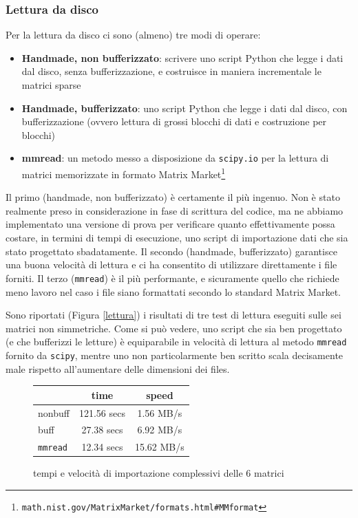 \documentclass[11pt,a4paper]{scrartcl}
\begin{document}
\subsubsection*{Lettura da disco}

Per la lettura da disco ci sono (almeno) tre modi di operare:
\begin{itemize}
\item \textbf{Handmade, non bufferizzato}: scrivere uno script Python che legge i dati dal disco, senza bufferizzazione, e costruisce in maniera incrementale le matrici sparse
\item \textbf{Handmade, bufferizzato}: uno script Python che legge i dati dal disco, con bufferizzazione (ovvero lettura di grossi blocchi di dati e costruzione per blocchi)
\item \textbf{mmread}: un metodo messo a disposizione da \texttt{scipy.io} per la lettura di matrici memorizzate in formato Matrix Market\footnote{\texttt{math.nist.gov/MatrixMarket/formats.html\#MMformat}}
\end{itemize}

Il primo (handmade, non bufferizzato) è certamente il più ingenuo. Non è stato realmente preso in considerazione in fase di scrittura del codice, ma ne abbiamo implementato una versione di prova per verificare quanto effettivamente possa costare, in termini di tempi di esecuzione, uno script di importazione dati che sia stato progettato sbadatamente. Il secondo (handmade, bufferizzato) garantisce una buona velocità di lettura e ci ha consentito di utilizzare direttamente i file forniti. Il terzo (\texttt{mmread}) è il più performante, e sicuramente quello che richiede meno lavoro nel caso i file siano formattati secondo lo standard Matrix Market.

Sono riportati (Figura \ref{lettura}) i risultati di tre test di lettura eseguiti sulle sei matrici non simmetriche. Come si può vedere, uno script che sia ben progettato (e che bufferizzi le letture) è equiparabile in velocità di lettura al metodo \texttt{mmread} fornito da \texttt{scipy}, mentre uno non particolarmente ben scritto scala decisamente male rispetto all'aumentare delle dimensioni dei files.

\begin{figure}[!ht]
\centering
\begin{tabular}{l|cc}
\toprule
& time & speed \\
\midrule
nonbuff & 121.56 secs & 1.56 MB/s \\
buff & 27.38 secs & 6.92 MB/s \\
\texttt{mmread} & 12.34 secs & 15.62 MB/s \\
\bottomrule
\end{tabular}
\caption{tempi e velocità di importazione complessivi delle 6 matrici}
\label{tabella1}
\end{figure}
\end{document}
